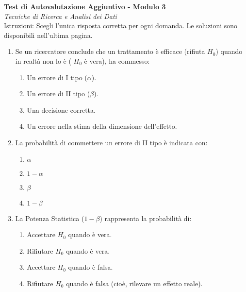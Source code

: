 \documentclass[12pt, a4paper]{article}
\newcommand{\alphaerr}{\alpha} %
\newcommand{\betaerr}{\beta}  %
\newcommand{\Hnull}{H_0} %
\begin{document}
\begin{center}
    \Large\textbf{Test di Autovalutazione Aggiuntivo - Modulo 3} \\
    \vspace{0.2cm}
    \large\textit{Tecniche di Ricerca e Analisi dei Dati} \\
    \vspace{0.5cm}
    \normalsize{Istruzioni: Scegli l'unica risposta corretta per ogni domanda. Le soluzioni sono disponibili nell'ultima pagina.}
\end{center}
\vspace{1cm}

\begin{enumerate} %
    \item Se un ricercatore conclude che un trattamento è efficace (rifiuta $\Hnull$) quando in realtà non lo è ( $\Hnull$ è vera), ha commesso:
    \begin{enumerate} %
        \item Un errore di I tipo ($\alphaerr$).
        \item Un errore di II tipo ($\betaerr$).
        \item Una decisione corretta.
        \item Un errore nella stima della dimensione dell'effetto.
    \end{enumerate}

    \item La probabilità di commettere un errore di II tipo è indicata con:
    \begin{enumerate}
        \item $\alphaerr$
        \item $1-\alphaerr$
        \item $\betaerr$
        \item $1-\betaerr$
    \end{enumerate}

    \item La Potenza Statistica ($1-\betaerr$) rappresenta la probabilità di:
    \begin{enumerate}
        \item Accettare $\Hnull$ quando è vera.
        \item Rifiutare $\Hnull$ quando è vera.
        \item Accettare $\Hnull$ quando è falsa.
        \item Rifiutare $\Hnull$ quando è falsa (cioè, rilevare un effetto reale).
    \end{enumerate}


\end{enumerate}
\end{document}
